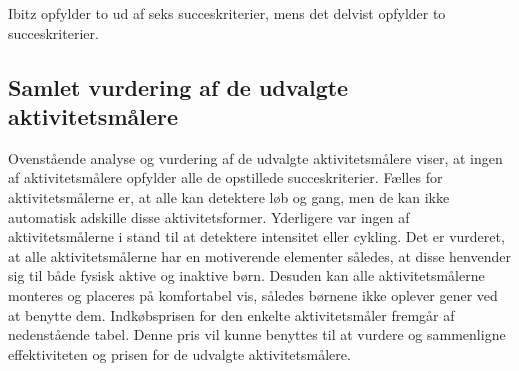 Ibitz opfylder to ud af seks succeskriterier, mens det delvist opfylder to succeskriterier.

\subsection{Samlet vurdering af de udvalgte aktivitetsmålere}
Ovenstående analyse og vurdering af de udvalgte aktivitetsmålere viser, at ingen af aktivitetsmålere opfylder alle de opstillede succeskriterier. \newline
Fælles for aktivitetsmålerne er, at alle kan detektere løb og gang, men de kan ikke automatisk adskille disse aktivitetsformer. Yderligere var ingen af aktivitetsmålerne i stand til at detektere intensitet eller cykling. Det er vurderet, at alle aktivitetsmålerne har en motiverende elementer således, at disse henvender sig til både fysisk aktive og inaktive børn. Desuden kan alle aktivitetsmålerne monteres og placeres på komfortabel vis, således børnene ikke oplever gener ved at benytte dem. Indkøbsprisen for den enkelte aktivitetsmåler fremgår af nedenstående tabel. Denne pris vil kunne benyttes til at vurdere og sammenligne effektiviteten og prisen for de udvalgte aktivitetsmålere.  


